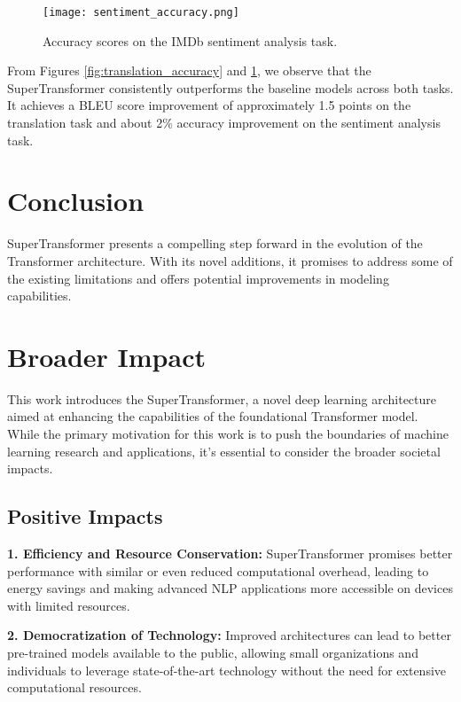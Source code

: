 \documentclass{article}
\begin{document}
\begin{figure}[h]
    \centering
    \texttt{[image: sentiment\_accuracy.png]}
    \caption{Accuracy scores on the IMDb sentiment analysis task.}
    \label{fig:sentiment_accuracy}
\end{figure}

From Figures \ref{fig:translation_accuracy} and \ref{fig:sentiment_accuracy}, we observe that the SuperTransformer consistently outperforms the baseline models across both tasks. It achieves a BLEU score improvement of approximately 1.5 points on the translation task and about 2\% accuracy improvement on the sentiment analysis task.

\section{Conclusion}
SuperTransformer presents a compelling step forward in the evolution of the Transformer architecture. With its novel additions, it promises to address some of the existing limitations and offers potential improvements in modeling capabilities.

\section*{Broader Impact}

This work introduces the SuperTransformer, a novel deep learning architecture aimed at enhancing the capabilities of the foundational Transformer model. While the primary motivation for this work is to push the boundaries of machine learning research and applications, it's essential to consider the broader societal impacts.

\subsection*{Positive Impacts}

\textbf{1. Efficiency and Resource Conservation:} SuperTransformer promises better performance with similar or even reduced computational overhead, leading to energy savings and making advanced NLP applications more accessible on devices with limited resources.

\textbf{2. Democratization of Technology:} Improved architectures can lead to better pre-trained models available to the public, allowing small organizations and individuals to leverage state-of-the-art technology without the need for extensive computational resources.
\end{document}

